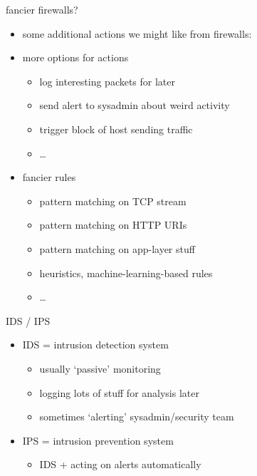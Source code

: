 \begin{frame}{fancier firewalls?}
    \begin{itemize}
    \item some additional actions we might like from firewalls:
    \vspace{.5cm}
    \item more options for actions
        \begin{itemize}
        \item log interesting packets for later
        \item send alert to sysadmin about weird activity
        \item trigger block of host sending traffic
        \item \ldots
        \end{itemize}
    \item fancier rules
        \begin{itemize}
        \item pattern matching on TCP stream
        \item pattern matching on HTTP URIs
        \item pattern matching on app-layer stuff
        \item heuristics, machine-learning-based rules
        \item \ldots
        \end{itemize}
    \end{itemize}
\end{frame}

\begin{frame}{IDS / IPS}
    \begin{itemize}
    \item IDS = intrusion detection system
        \begin{itemize}
        \item usually `passive' monitoring
        \item logging lots of stuff for analysis later
        \item sometimes `alerting' sysadmin/security team
        \end{itemize}
    \item IPS = intrusion prevention system
        \begin{itemize}
        \item IDS + acting on alerts automatically
        \end{itemize}
    \end{itemize}
\end{frame}


